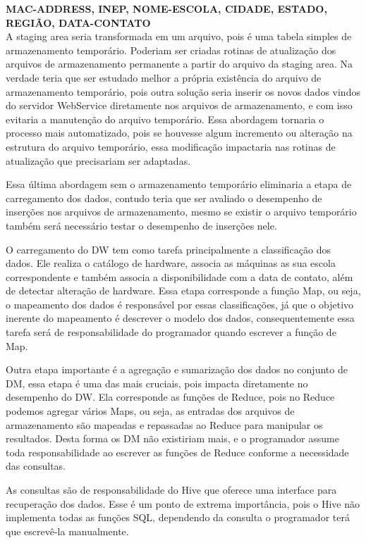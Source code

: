 \textbf{MAC-ADDRESS, INEP, NOME-ESCOLA, CIDADE, ESTADO, REGIÃO, DATA-CONTATO}\\

A staging area seria transformada em um arquivo, pois é uma tabela simples de
armazenamento temporário. Poderiam ser criadas rotinas de atualização dos
arquivos de armazenamento permanente a partir do arquivo da staging area. Na
verdade teria que ser estudado melhor a própria existência do arquivo de
armazenamento temporário, pois outra solução seria inserir os novos dados vindos
do servidor WebService diretamente nos arquivos de armazenamento, e com isso
evitaria a manutenção do arquivo temporário. Essa abordagem tornaria o processo
mais automatizado, pois se houvesse algum incremento ou alteração na
estrutura do arquivo temporário, essa modificação impactaria nas rotinas de
atualização que precisariam ser adaptadas.
 
Essa última abordagem sem o armazenamento temporário eliminaria a etapa de
carregamento dos dados, contudo teria que ser avaliado o desempenho de inserções
nos arquivos de armazenamento, mesmo se existir o arquivo temporário também será
necessário testar o desempenho de inserções nele.

O carregamento do DW tem como tarefa principalmente a classificação dos dados.
Ele realiza o catálogo de hardware, associa as máquinas as sua escola
correspondente e também associa a disponibilidade com a data de contato, além de
detectar alteração de hardware. Essa etapa corresponde a função Map, ou
seja, o mapeamento dos dados é responsável por essas classificações, já que o
objetivo inerente do mapeamento é descrever o modelo dos dados, consequentemente
essa tarefa será de responsabilidade do programador quando escrever a função
de Map.

Outra etapa importante é a agregação e sumarização dos dados no conjunto de DM,
essa etapa é uma das mais cruciais, pois impacta diretamente no desempenho do
DW. Ela corresponde as funções de Reduce, pois no Reduce podemos
agregar vários Maps, ou seja, as entradas dos arquivos de armazenamento são
mapeadas e repassadas ao Reduce para manipular os resultados. Desta forma os DM
não existiriam mais, e o programador assume toda responsabilidade ao escrever as
funções de Reduce conforme a necessidade das consultas.

As consultas são de responsabilidade do Hive que oferece uma interface para
recuperação dos dados. Esse é um ponto de extrema importância, pois o Hive não
implementa todas as funções SQL, dependendo da consulta o programador terá que
escrevê-la manualmente.

